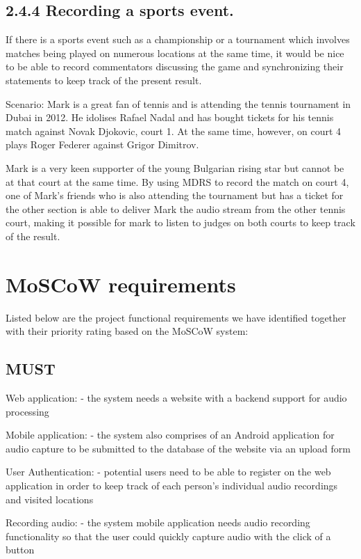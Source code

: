 \documentclass{l3proj}
\begin{document}
\subsection{2.4.4 Recording a sports event.} If there is a sports event such as a championship or a tournament which involves matches being played on numerous locations at the same time, it would be nice to be able to record commentators discussing the game and synchronizing their statements to keep track of the present result.

Scenario: Mark is a great fan of tennis and is attending the tennis tournament in Dubai in 2012. He idolises Rafael Nadal and has bought tickets for his tennis match against Novak Djokovic, court 1. At the same time, however, on court 4 plays Roger Federer against Grigor Dimitrov.

Mark is a very keen supporter of the young Bulgarian rising star but cannot be at that court at the same time. By using MDRS to record the match on court 4, one of Mark’s friends who is also attending the tournament but has a ticket for the other section is able to deliver Mark the audio stream from the other tennis court, making it possible for mark to listen to judges on both courts to keep track of the result.




\section{MoSCoW requirements}

Listed below are the project functional requirements we have identified together with their priority rating based on the MoSCoW system:

	\subsection{MUST}
		Web application:
			- the system needs a website with a backend support for audio processing

		Mobile application:
			- the system also comprises of an Android application for audio capture to be submitted to the database of the website via an upload form

		User Authentication:
			- potential users need to be able to register on the web application in order to keep track of each person's individual audio recordings and visited locations

		Recording audio:
			- the system mobile application needs audio recording functionality so that the user could quickly capture audio with the click of a button
\end{document}

